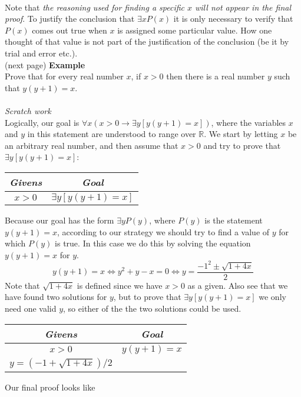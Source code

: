 \documentclass{report}
\theoremstyle{definition}
\begin{document}
\vspace{1mm}\\
Note that \textit{the reasoning used for finding a specific $x$ will not appear in the final proof}. To justify the conclusion that $\exists xP(x)$ it is only necessary to verify that $P(x)$ comes
out true when $x$ is assigned some particular value. How one thought of that value is not part of the justification of the conclusion (be it by trial and error etc.).\\
(next page)
\newpage
\noindent\textbf{Example}\\
Prove that for every real number $x$, if $x>0$ then there is a real number $y$ such that $y(y+1)=x$.\\
\vspace{1mm}\\
\textit{Scratch work}\\
Logically, our goal is $\forall x (x>0\to\exists y[y(y+1)=x])$, where the variables $x$ and $y$ in this statement are
understood to range over $\mathbb R$. We start by letting $x$ be an arbitrary real number, and then assume that $x>0$ and
try to prove that $\exists y[y(y+1)=x]$:
\begin{center}
\begin{tabular}{c|c}
\textit{Givens}&\textit{Goal}\\
\hline
$x>0$&$\exists y[y(y+1)=x]$
\end{tabular}
\end{center}
Because our goal has the form $\exists yP(y)$, where $P(y)$ is the statement $y(y+1)=x$, according to our strategy we should
try to find a value of $y$ for which $P(y)$ is true. In this case we do this by solving the equation $y(y+1)=x$ for $y$.
\begin{equation*}
y(y+1)=x\iff y^2+y-x=0\iff y=\frac{-1^2\pm\sqrt{1+4x}}{2}
\end{equation*}
Note that $\sqrt{1+4x}$ is defined since we have $x>0$ as a given. Also see that we have found two solutions for $y$, but to
prove that $\exists y[y(y+1)=x]$ we only need one valid $y$, so either of the the two solutions could be used. 
\begin{center}
\begin{tabular}{c|c}
\textit{Givens}&\textit{Goal}\\
\hline
$x>0$&$y(y+1)=x$\\
$y=(-1+\sqrt{1+4x})/2$&
\end{tabular}
\end{center}
Our final proof looks like\\
\end{document}
